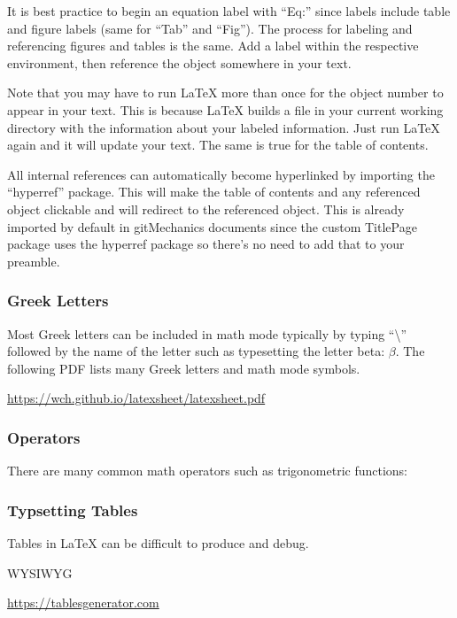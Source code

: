 It is best practice to begin an equation label with ``Eq:'' since labels include table and figure labels (same for ``Tab'' and ``Fig''). The process for labeling and referencing figures and tables is the same. Add a label within the respective environment, then reference the object somewhere in your text.

Note that you may have to run \LaTeX{} more than once for the object number to appear in your text. This is because \LaTeX{} builds a file in your current working directory with the information about your labeled information. Just run \LaTeX{} again and it will update your text. The same is true for the table of contents.

All internal references can automatically become hyperlinked by importing the ``hyperref'' package. This will make the table of contents and any referenced object clickable and will redirect to the referenced object. This is already imported by default in gitMechanics documents since the custom TitlePage package uses the hyperref package so there's no need to add that to your preamble.

\subsubsection{Greek Letters}
Most Greek letters can be included in math mode typically by typing ``\textbackslash'' followed by the name of the letter such as typesetting the letter beta: $\beta$. The following PDF lists many Greek letters and math mode symbols.

\begin{center}
	\url{https://wch.github.io/latexsheet/latexsheet.pdf}
\end{center}

\subsubsection{Operators}
There are many common math operators such as trigonometric functions:

\begin{center}
\begin{latexcode}
\sin \csc
\cos \sec
\tan \cot
\end{latexcode}
\end{center}

\subsubsection{Typsetting Tables}
Tables in \LaTeX{} can be difficult to produce and debug. 

WYSIWYG

\url{https://tablesgenerator.com}










